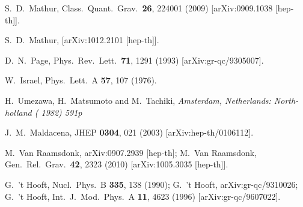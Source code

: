 \documentclass[12pt]{article}
\begin{document}
\begin{thebibliography}{10}
  S.~D.~Mathur,
  Class.\ Quant.\ Grav.\  {\bf 26}, 224001 (2009)
  [arXiv:0909.1038 [hep-th]].

  S.~D.~Mathur,
   [arXiv:1012.2101 [hep-th]].


  D.~N.~Page,
  Phys.\ Rev.\ Lett.\  {\bf 71}, 1291 (1993)
  [arXiv:gr-qc/9305007].
  
  
  W.~Israel,
  Phys.\ Lett.\  A {\bf 57}, 107 (1976).

  H.~Umezawa, H.~Matsumoto and M.~Tachiki,
{\it  Amsterdam, Netherlands: North-holland ( 1982) 591p}

  J.~M.~Maldacena,
  JHEP {\bf 0304}, 021 (2003)
  [arXiv:hep-th/0106112].

  M.~Van Raamsdonk,
  arXiv:0907.2939 [hep-th];
  M.~Van Raamsdonk,
  Gen.\ Rel.\ Grav.\  {\bf 42}, 2323 (2010)
  [arXiv:1005.3035 [hep-th]].











G.~'t Hooft,
  Nucl.\ Phys.\  B {\bf 335}, 138 (1990);
 G.~'t Hooft,
  arXiv:gr-qc/9310026;
  G.~'t Hooft,
  Int.\ J.\ Mod.\ Phys.\  A {\bf 11}, 4623 (1996)
  [arXiv:gr-qc/9607022].


\end{thebibliography}
\end{document}
